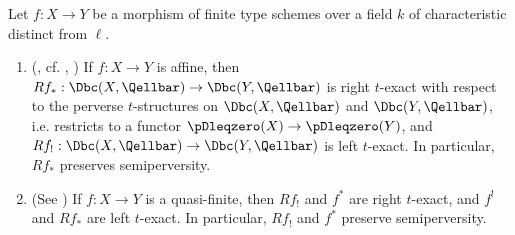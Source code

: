 \begin{lemma}   \label{lemma:derived_pushforward_of_affine_preserves_semiperversity_and_derived_proper_pushforward_of_quasi_finite_perverse_semiperversity}

    Let $f: X \to Y $ be a morphism of finite type schemes over a field $k$ of characteristic distinct from $\ell$. 
    \begin{enumerate}
        \item (\cite[Th\'eor\`eme 4.1.1]{beilinson_berstein_deligne_atlesI}, cf. \cite[Expos\'e XIV, Th\'eor\`eme]{SGA4_III}, \cite[Theorem III.6.1]{kiehl_weissauer_wcps}) If $f: X \to Y$ is affine, then $Rf_*: \Dbc(X, \Qellbar) \to \Dbc(Y, \Qellbar)$ is right $t$-exact with respect to the perverse $t$-structures on $\Dbc(X, \Qellbar)$ and $\Dbc(Y, \Qellbar)$, i.e. restricts to a functor $\pDleqzero(X) \to \pDleqzero(Y)$, and $Rf_!: \Dbc(X, \Qellbar) \to \Dbc(Y, \Qellbar)$ is left $t$-exact. In particular, $Rf_*$ preserves semiperversity.
        
        \item (See {\cite[Proposition 2.2.5]{beilinson_berstein_deligne_atlesI}}) If $f: X \to Y$ is a quasi-finite, then $Rf_!$ and $f^*$ are right $t$-exact, and $f^!$ and $Rf_*$ are left $t$-exact. In particular, $Rf_!$ and $f^*$ preserve semiperversity.
        \end{enumerate}
\end{lemma}